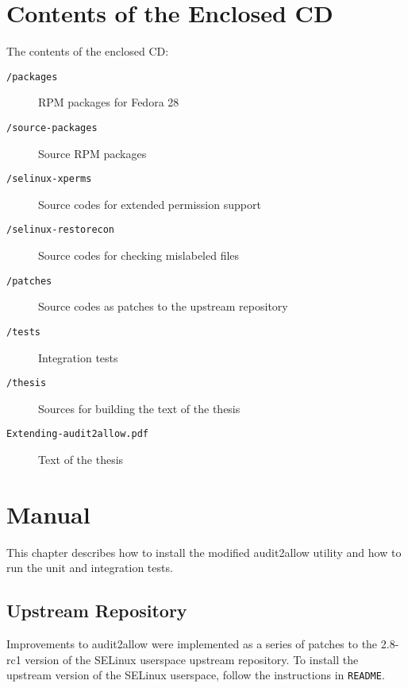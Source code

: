 
\chapter{Contents of the Enclosed CD}

The contents of the enclosed CD:
\begin{description}
    \item [\texttt{/packages}] RPM packages for Fedora 28
    \item [\texttt{/source-packages}] Source RPM packages
    \item [\texttt{/selinux-xperms}] Source codes for extended permission support
    \item [\texttt{/selinux-restorecon}] Source codes for checking mislabeled
        files
    \item [\texttt{/patches}] Source codes as patches to the upstream
        repository
    \item [\texttt{/tests}] Integration tests
    \item [\texttt{/thesis}] Sources for building the text of the thesis
    \item [\texttt{Extending-audit2allow.pdf}] Text of the thesis
\end{description}

\chapter{Manual}

This chapter describes how to install the modified audit2allow utility and how
to run the unit and integration tests.

\section{Upstream Repository}

Improvements to audit2allow were implemented as a series of patches to the
2.8-rc1 version of the SELinux userspace upstream repository. To install the
upstream version of the SELinux userspace, follow the instructions in
\texttt{README}.

